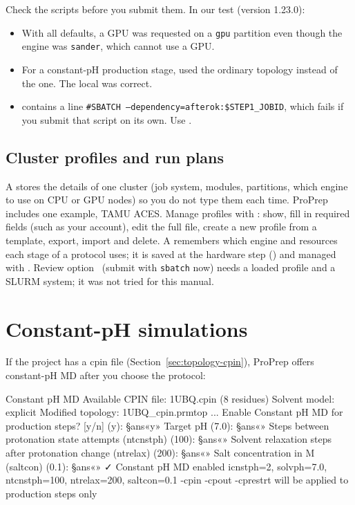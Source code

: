 \begin{watchout}
Check the scripts before you submit them. In our test (version 1.23.0):
\begin{itemize}
  \item With all defaults, a GPU was requested on a \texttt{gpu} partition
        even though the engine was \texttt{sander}, which cannot use a GPU.
  \item For a constant-pH production stage,  used the
        ordinary topology instead of the  one. The local
         was correct.
  \item {} contains a line \texttt{\#SBATCH
        --dependency=afterok:\$STEP1\_JOBID}, which fails if you submit that
        script on its own. Use .
\end{itemize}
\end{watchout}

\subsection{Cluster profiles and run plans}

A  stores the details of one cluster (job system,
modules, partitions, which engine to use on CPU or GPU nodes) so you do not
type them each time. ProPrep includes one example, \textsf{TAMU ACES}. Manage
profiles with  : show, fill in required fields (such as your
account), edit the full file, create a new profile from a template, export,
import and delete. A  remembers which engine and resources
each stage of a protocol uses; it is saved at the hardware step () and
managed with  . Review option~ (submit with
\texttt{sbatch} now) needs a loaded profile and a SLURM system; it was not
tried for this manual.

\section{Constant-pH simulations}\label{sec:runningmd-cph}

If the project has a cpin file (Section~\ref{sec:topology-cpin}), ProPrep
offers constant-pH MD after you choose the protocol:

\begin{screen}
Constant pH MD Available
  CPIN file: 1UBQ.cpin (8 residues)
  Solvent model: explicit
  Modified topology: 1UBQ_cpin.prmtop
...
Enable Constant pH MD for production steps? [y/n] (y): §ans«y»
Target pH (7.0): §ans«»
Steps between protonation state attempts (ntcnstph) (100): §ans«»
Solvent relaxation steps after protonation change (ntrelax) (200): §ans«»
Salt concentration in M (saltcon) (0.1): §ans«»
✓ Constant pH MD enabled
  icnstph=2, solvph=7.0, ntcnstph=100, ntrelax=200, saltcon=0.1
  -cpin -cpout -cprestrt will be applied to production steps only
\end{screen}

